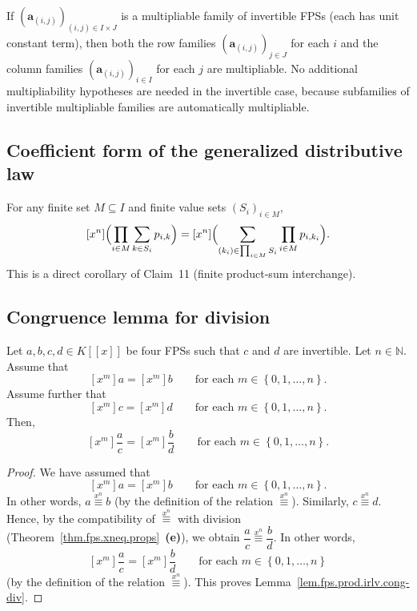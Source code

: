 \begin{theorem}
\label{thm.fps.fubini-inv.lean}
\leanhelper
\leanok
If $(\mathbf{a}_{(i,j)})_{(i,j) \in I \times J}$ is a multipliable family
of invertible FPSs (each has unit constant term), then both the row families
$(\mathbf{a}_{(i,j)})_{j \in J}$ for each $i$ and the column families
$(\mathbf{a}_{(i,j)})_{i \in I}$ for each $j$ are multipliable. No additional
multipliability hypotheses are needed in the invertible case, because
subfamilies of invertible multipliable families are automatically multipliable.
\end{theorem}

\subsection{Coefficient form of the generalized distributive law}

\begin{lemma}
\label{lem.fps.prodrule-inf-inf-coeff}
\leanhelper
\leanok
For any finite set $M \subseteq I$ and finite value sets $(S_i)_{i \in M}$,
\[
[x^n]\Bigl(\prod_{i \in M} \sum_{k \in S_i} p_{i,k}\Bigr)
= [x^n]\Bigl(\sum_{(k_i) \in \prod_{i \in M} S_i} \prod_{i \in M} p_{i,k_i}\Bigr).
\]
This is a direct corollary of Claim~11 (finite product-sum interchange).
\end{lemma}

\subsection{Congruence lemma for division}

\begin{lemma}
\label{lem.fps.prod.irlv.cong-div}
\leantarget
\leanok
Let $a, b, c, d \in K\left[\left[x\right]\right]$ be four FPSs such that
$c$ and $d$ are invertible. Let $n \in \mathbb{N}$. Assume that
\[
\left[x^{m}\right] a = \left[x^{m}\right] b
\qquad \text{for each } m \in \left\{0, 1, \ldots, n\right\}.
\]
Assume further that
\[
\left[x^{m}\right] c = \left[x^{m}\right] d
\qquad \text{for each } m \in \left\{0, 1, \ldots, n\right\}.
\]
Then,
\[
\left[x^{m}\right] \dfrac{a}{c} = \left[x^{m}\right] \dfrac{b}{d}
\qquad \text{for each } m \in \left\{0, 1, \ldots, n\right\}.
\]
\end{lemma}

\begin{proof}
\leanok
We have assumed that
\[
\left[x^{m}\right] a = \left[x^{m}\right] b
\qquad \text{for each } m \in \left\{0, 1, \ldots, n\right\}.
\]
In other words, $a \overset{x^n}{\equiv} b$ (by the definition of the
relation $\overset{x^n}{\equiv}$). Similarly,
$c \overset{x^n}{\equiv} d$. Hence, by the compatibility of
$\overset{x^n}{\equiv}$ with division
(Theorem~\ref{thm.fps.xneq.props}~\textbf{(e)}), we obtain
$\dfrac{a}{c} \overset{x^n}{\equiv} \dfrac{b}{d}$. In other words,
\[
\left[x^{m}\right] \dfrac{a}{c} = \left[x^{m}\right] \dfrac{b}{d}
\qquad \text{for each } m \in \left\{0, 1, \ldots, n\right\}
\]
(by the definition of the relation $\overset{x^n}{\equiv}$).
This proves Lemma~\ref{lem.fps.prod.irlv.cong-div}.
\end{proof}

